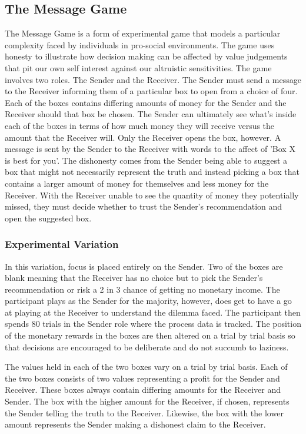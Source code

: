 \documentclass[man, floatsintext]{apa7}
\begin{document}
\subsection{The Message Game}

The Message Game is a form of experimental game that models a particular complexity faced by individuals in pro-social environments. The game uses honesty to illustrate how decision making can be affected by value judgements that pit our own self interest against our altruistic sensitivities. 
The game involves two roles. The Sender and the Receiver. The Sender must send a message to the Receiver informing them of a particular box to open from a choice of four. Each of the boxes contains differing amounts of money for the Sender and the Receiver should that box be chosen. The Sender can ultimately see what's inside each of the boxes in terms of how much money they will receive versus the amount that the Receiver will. Only the Receiver opens the box, however. A message is sent by the Sender to the Receiver with words to the affect of 'Box X is best for you'. The dishonesty comes from the Sender being able to suggest a box that might not necessarily represent the truth and instead picking a box that contains a larger amount of money for themselves and less money for the Receiver. With the Receiver unable to see the quantity of money they potentially missed, they must decide whether to trust the Sender's recommendation and open the suggested box.

\subsubsection{Experimental Variation}

In this variation, focus is placed entirely on the Sender. Two of the boxes are blank meaning that the Receiver has no choice but to pick the Sender's recommendation or risk a 2 in 3 chance of getting no monetary income. The participant plays as the Sender for the majority, however, does get to have a go at playing at the Receiver to understand the dilemma faced. The participant then spends 80 trials in the Sender role where the process data is tracked. The position of the monetary rewards in the boxes are then altered on a trial by trial basis so that decisions are encouraged to be deliberate and do not succumb to laziness. 

The values held in each of the two boxes vary on a trial by trial basis. Each of the two boxes consists of two values representing a profit for the Sender and Receiver. These boxes always contain differing amounts for the Receiver and Sender. The box with the higher amount for the Receiver, if chosen, represents the Sender telling the truth to the Receiver. Likewise, the box with the lower amount represents the Sender making a dishonest claim to the Receiver.
\end{document}

